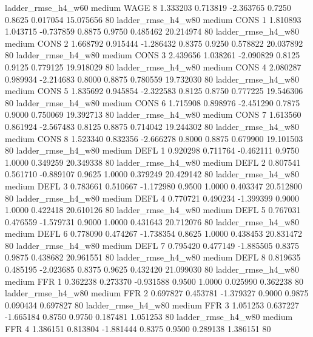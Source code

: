     ladder_rmse_h4_w60     medium     WAGE                 8  1.333203 0.713819 -2.363765 0.7250 0.8625  0.017054   15.075656 80
    ladder_rmse_h4_w80     medium     CONS                 1  1.810893 1.043715 -0.737859 0.8875 0.9750  0.485462   20.214974 80
    ladder_rmse_h4_w80     medium     CONS                 2  1.668792 0.915444 -1.286432 0.8375 0.9250  0.578822   20.037892 80
    ladder_rmse_h4_w80     medium     CONS                 3  2.439656 1.038261 -2.090829 0.8125 0.9125  0.779125   19.918029 80
    ladder_rmse_h4_w80     medium     CONS                 4  2.080287 0.989934 -2.214683 0.8000 0.8875  0.780559   19.732030 80
    ladder_rmse_h4_w80     medium     CONS                 5  1.835692 0.945854 -2.322583 0.8125 0.8750  0.777225   19.546306 80
    ladder_rmse_h4_w80     medium     CONS                 6  1.715908 0.898976 -2.451290 0.7875 0.9000  0.750069   19.392713 80
    ladder_rmse_h4_w80     medium     CONS                 7  1.613560 0.861924 -2.567483 0.8125 0.8875  0.714042   19.244302 80
    ladder_rmse_h4_w80     medium     CONS                 8  1.523340 0.832356 -2.666278 0.8000 0.8875  0.679900   19.101503 80
    ladder_rmse_h4_w80     medium     DEFL                 1  0.920298 0.711764 -0.462111 0.9750 1.0000  0.349259   20.349338 80
    ladder_rmse_h4_w80     medium     DEFL                 2  0.807541 0.561710 -0.889107 0.9625 1.0000  0.379249   20.429142 80
    ladder_rmse_h4_w80     medium     DEFL                 3  0.783661 0.510667 -1.172980 0.9500 1.0000  0.403347   20.512800 80
    ladder_rmse_h4_w80     medium     DEFL                 4  0.770721 0.490234 -1.399399 0.9000 1.0000  0.422418   20.610126 80
    ladder_rmse_h4_w80     medium     DEFL                 5  0.767031 0.476559 -1.579731 0.9000 1.0000  0.431643   20.712076 80
    ladder_rmse_h4_w80     medium     DEFL                 6  0.778090 0.474267 -1.738354 0.8625 1.0000  0.438453   20.831472 80
    ladder_rmse_h4_w80     medium     DEFL                 7  0.795420 0.477149 -1.885505 0.8375 0.9875  0.438682   20.961551 80
    ladder_rmse_h4_w80     medium     DEFL                 8  0.819635 0.485195 -2.023685 0.8375 0.9625  0.432420   21.099030 80
    ladder_rmse_h4_w80     medium      FFR                 1  0.362238 0.273370 -0.931588 0.9500 1.0000  0.025990    0.362238 80
    ladder_rmse_h4_w80     medium      FFR                 2  0.697827 0.453781 -1.379327 0.9000 0.9875  0.090434    0.697827 80
    ladder_rmse_h4_w80     medium      FFR                 3  1.051253 0.637227 -1.665184 0.8750 0.9750  0.187481    1.051253 80
    ladder_rmse_h4_w80     medium      FFR                 4  1.386151 0.813804 -1.881444 0.8375 0.9500  0.289138    1.386151 80
